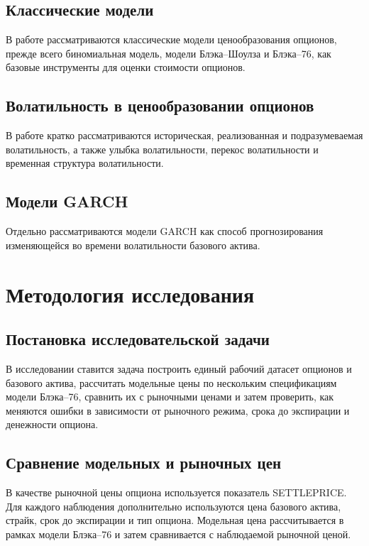 \documentclass[11pt,a4paper]{article}
\begin{document}
\subsection{Классические модели}

В работе рассматриваются классические модели ценообразования опционов, прежде всего биномиальная модель, модели Блэка--Шоулза и Блэка--76, как базовые инструменты для оценки стоимости опционов.

\subsection{Волатильность в ценообразовании опционов}

В работе кратко рассматриваются историческая, реализованная и подразумеваемая волатильность, а также улыбка волатильности, перекос волатильности и временная структура волатильности.

\subsection{Модели GARCH}

Отдельно рассматриваются модели GARCH как способ прогнозирования изменяющейся во времени волатильности базового актива.

\section{Методология исследования}

\subsection{Постановка исследовательской задачи}

В исследовании ставится задача построить единый рабочий датасет опционов и базового актива, рассчитать модельные цены по нескольким спецификациям модели Блэка--76, сравнить их с рыночными ценами и затем проверить, как меняются ошибки в зависимости от рыночного режима, срока до экспирации и денежности опциона.

\subsection{Сравнение модельных и рыночных цен}

В качестве рыночной цены опциона используется показатель SETTLEPRICE. Для каждого наблюдения дополнительно используются цена базового актива, страйк, срок до экспирации и тип опциона. Модельная цена рассчитывается в рамках модели Блэка--76 и затем сравнивается с наблюдаемой рыночной ценой.
\end{document}
